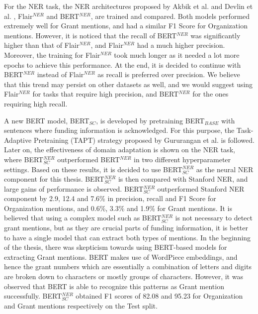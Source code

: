\documentclass{report}
\theoremstyle{definition}
\theoremstyle{remark}
\begin{document}
For the NER task, the NER architectures proposed by Akbik et al. \cite{flairpaper} and Devlin et al. \cite{BERT}, Flair$^{NER}$ and BERT$^{NER}$, are trained and compared. Both models performed extremely well for Grant mentions, and had a similar F1 Score for Organization mentions. However, it is noticed that the recall of BERT$^{NER}$ was significantly higher than that of Flair$^{NER}$, and Flair$^{NER}$ had a much higher precision. Moreover, the training for Flair$^{NER}$ took much longer as it needed a lot more epochs to achieve this performance. At the end, it is decided to continue with BERT$^{NER}$ instead of Flair$^{NER}$ as recall is preferred over precision. We believe that this trend may persist on other datasets as well, and we would suggest using Flair$^{NER}$ for tasks that require high precision, and BERT$^{NER}$ for the ones requiring high recall.

A new BERT model, BERT$_{SC}$, is developed by pretraining BERT$_{BASE}$ with sentences where funding information is acknowledged. For this purpose, the Task-Adaptive Pretraining (TAPT) strategy proposed by Gururangan et al. \cite{DontStop} is followed. Later on, the effectiveness of domain adaptation is shown on the NER task, where BERT$_{SC}^{NER}$ outperformed BERT$^{NER}$ in two different hyperparameter settings. Based on these results, it is decided to use BERT$_{SC}^{NER}$ as the neural NER component for this thesis. BERT$_{SC}^{NER}$ is then compared with Stanford NER, and large gains of performance is observed. BERT$_{SC}^{NER}$ outperformed Stanford NER component by 2.9, 12.4 and 7.6\% in precision, recall and F1 Score for Organization mentions, and 0.6\%, 3.3\% and 1.9\% for Grant mentions. It is believed that using a complex model such as BERT$_{SC}^{NER}$ is not necessary to detect grant mentions, but as they are crucial parts of funding information, it is better to have a single model that can extract both types of mentions. In the beginning of the thesis, there was skepticism towards using BERT-based models for extracting Grant mentions. BERT makes use of WordPiece embeddings, and hence the grant numbers which are essentially a combination of letters and digits are broken down to characters or mostly groups of characters. However, it was observed that BERT is able to recognize this patterns as Grant mention successfully. BERT$_{SC}^{NER}$ obtained F1 scores of 82.08 and 95.23 for Organization and Grant mentions respectively on the Test split.
\end{document}
